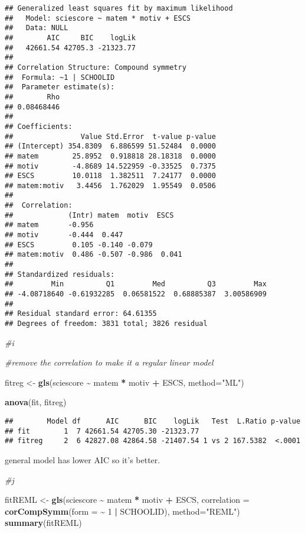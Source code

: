 \documentclass[
]{article}
\newenvironment{Shaded}{\begin{snugshade}}{\end{snugshade}}
\newcommand{\AttributeTok}[1]{\textcolor[rgb]{0.13,0.29,0.53}{#1}}
\newcommand{\CommentTok}[1]{\textcolor[rgb]{0.56,0.35,0.01}{\textit{#1}}}
\newcommand{\DecValTok}[1]{\textcolor[rgb]{0.00,0.00,0.81}{#1}}
\newcommand{\FunctionTok}[1]{\textcolor[rgb]{0.13,0.29,0.53}{\textbf{#1}}}
\newcommand{\NormalTok}[1]{#1}
\newcommand{\OtherTok}[1]{\textcolor[rgb]{0.56,0.35,0.01}{#1}}
\newcommand{\SpecialCharTok}[1]{\textcolor[rgb]{0.81,0.36,0.00}{\textbf{#1}}}
\newcommand{\StringTok}[1]{\textcolor[rgb]{0.31,0.60,0.02}{#1}}
\begin{document}
\begin{verbatim}
## Generalized least squares fit by maximum likelihood
##   Model: sciescore ~ matem * motiv + ESCS 
##   Data: NULL 
##        AIC     BIC    logLik
##   42661.54 42705.3 -21323.77
## 
## Correlation Structure: Compound symmetry
##  Formula: ~1 | SCHOOLID 
##  Parameter estimate(s):
##        Rho 
## 0.08468446 
## 
## Coefficients:
##                Value Std.Error  t-value p-value
## (Intercept) 354.8309  6.886599 51.52484  0.0000
## matem        25.8952  0.918818 28.18318  0.0000
## motiv        -4.8689 14.522959 -0.33525  0.7375
## ESCS         10.0118  1.382511  7.24177  0.0000
## matem:motiv   3.4456  1.762029  1.95549  0.0506
## 
##  Correlation: 
##             (Intr) matem  motiv  ESCS  
## matem       -0.956                     
## motiv       -0.444  0.447              
## ESCS         0.105 -0.140 -0.079       
## matem:motiv  0.486 -0.507 -0.986  0.041
## 
## Standardized residuals:
##         Min          Q1         Med          Q3         Max 
## -4.08718640 -0.61932285  0.06581522  0.68885387  3.00586909 
## 
## Residual standard error: 64.61355 
## Degrees of freedom: 3831 total; 3826 residual
\end{verbatim}

\begin{Shaded}
\begin{Highlighting}[]
\CommentTok{\#i}

\CommentTok{\#remove the correlation to make it a regular linear model}

\NormalTok{fitreg }\OtherTok{\textless{}{-}} \FunctionTok{gls}\NormalTok{(sciescore }\SpecialCharTok{\textasciitilde{}}\NormalTok{ matem }\SpecialCharTok{*}\NormalTok{ motiv }\SpecialCharTok{+}\NormalTok{ ESCS,}
            \AttributeTok{method=}\StringTok{"ML"}\NormalTok{)}

\FunctionTok{anova}\NormalTok{(fit, fitreg)}
\end{Highlighting}
\end{Shaded}

\begin{verbatim}
##        Model df      AIC      BIC    logLik   Test  L.Ratio p-value
## fit        1  7 42661.54 42705.30 -21323.77                        
## fitreg     2  6 42827.08 42864.58 -21407.54 1 vs 2 167.5382  <.0001
\end{verbatim}

general model has lower AIC so it's better.

\begin{Shaded}
\begin{Highlighting}[]
\CommentTok{\#j}

\NormalTok{fitREML }\OtherTok{\textless{}{-}} \FunctionTok{gls}\NormalTok{(sciescore }\SpecialCharTok{\textasciitilde{}}\NormalTok{ matem }\SpecialCharTok{*}\NormalTok{ motiv }\SpecialCharTok{+}\NormalTok{ ESCS,}
            \AttributeTok{correlation =} \FunctionTok{corCompSymm}\NormalTok{(}\AttributeTok{form =} \SpecialCharTok{\textasciitilde{}} \DecValTok{1} \SpecialCharTok{|}\NormalTok{ SCHOOLID),}
            \AttributeTok{method=}\StringTok{"REML"}\NormalTok{)}
\FunctionTok{summary}\NormalTok{(fitREML)}
\end{Highlighting}
\end{Shaded}
\end{document}
